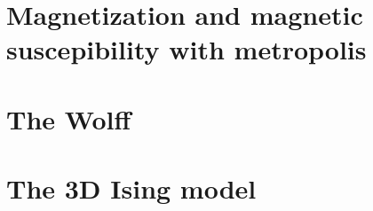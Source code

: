 \documentclass[11pt,a4paper]{article}
\begin{document}
\pagebreak





\section{Magnetization and magnetic suscepibility with metropolis}

\section{The Wolff}

\section{The 3D Ising model}
\end{document}
